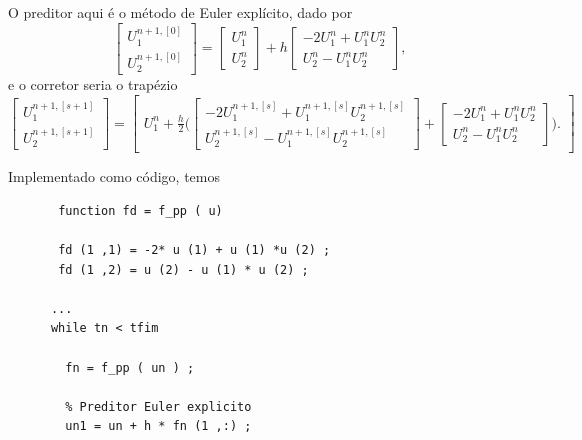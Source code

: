 \documentclass[../differential_methods.tex]{subfiles}
\begin{document}
\begin{example}
	O preditor aqui é o método de Euler explícito, dado por
	\[
		\begin{bmatrix}
			U_{1}^{n+1, [0]} \\
			U_{2}^{n+1, [0]}
		\end{bmatrix} = \begin{bmatrix}
			U_{1}^{n} \\
			U_{2}^{n}
		\end{bmatrix} + h \begin{bmatrix}
			-2U_{1}^{n} + U_{1}^{n}U_{2}^{n} \\
			U_{2}^{n} - U_{1}^{n} U_{2}^{n}
		\end{bmatrix},
	\]
	e o corretor seria o trapézio
	\[
		\begin{bmatrix}
			U_{1}^{n+1, [s+1]} \\
			U_{2}^{n+1, [s+1]}
		\end{bmatrix} = \begin{bmatrix}
			U_{1}^{n} + \frac{h}{2}\biggl(\begin{bmatrix}
					                              -2U_{1}^{n+1, [s]} + U_{1}^{n+1, [s]} U_{2}^{n+1, [s]} \\
					                              U_{2}^{n+1, [s]} - U_{1}^{n+1, [s]}U_{2}^{n+1, [s]}
				                              \end{bmatrix} + \begin{bmatrix}
					                                              -2U_{1}^{n } + U_{1}^{n}U_{2}^{n} \\
					                                              U_{2}^{n} - U_{1}^{n} U_{2}^{n}
				                                              \end{bmatrix}\biggr).
		\end{bmatrix}
	\]

	Implementado como código, temos
	\begin{listing}[H]
		\caption{Implementação Preditor-Corretor de Lotka-Volterra}
		\begin{verbatim}
       function fd = f_pp ( u)

       fd (1 ,1) = -2* u (1) + u (1) *u (2) ;
       fd (1 ,2) = u (2) - u (1) * u (2) ;

      ...
      while tn < tfim

        fn = f_pp ( un ) ;

        % Preditor Euler explicito
        un1 = un + h * fn (1 ,:) ;


\end{verbatim}
\end{listing}
\end{example}
\end{document}
